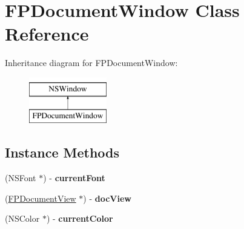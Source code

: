 \hypertarget{interface_f_p_document_window}{}\section{F\+P\+Document\+Window Class Reference}
\label{interface_f_p_document_window}
Inheritance diagram for F\+P\+Document\+Window\+:\begin{figure}[H]
\begin{center}
\leavevmode
\includegraphics[height=2.000000cm]{interface_f_p_document_window}
\end{center}
\end{figure}
\subsection*{Instance Methods}
\begin{DoxyCompactItemize}
\item 
\mbox{\label{interface_f_p_document_window_aac037f71707c8adb4a25e94b1bce14d0}} 
(N\+S\+Font $\ast$) -\/ {\bfseries current\+Font}
\item 
\mbox{\label{interface_f_p_document_window_a41a1c59470a7527fa8e6c8ad83303e9b}} 
(\mbox{\hyperlink{interface_f_p_document_view}{F\+P\+Document\+View}} $\ast$) -\/ {\bfseries doc\+View}
\item 
\mbox{\label{interface_f_p_document_window_a6403a79a24beaa62eee5cfe6ea7f8877}} 
(N\+S\+Color $\ast$) -\/ {\bfseries current\+Color}
\end{DoxyCompactItemize}
